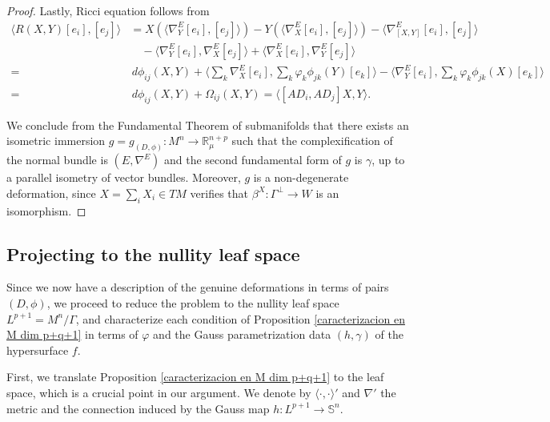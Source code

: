 \documentclass{article}
\theoremstyle{remark}
\begin{document}
\begin{proof}
    Lastly, Ricci equation follows from
    \begin{align*}
        \langle R(X,Y)[e_i],[e_j]\rangle&=X(\langle\nabla^E_Y[e_i],[e_j]\rangle)-Y(\langle\nabla^E_X[e_i],[e_j]\rangle)-\langle\nabla^E_{[X,Y]}[e_i],[e_j]\rangle\\
        &\quad-\langle\nabla^E_Y[e_i],\nabla^E_X[e_j]\rangle+\langle\nabla^E_X[e_i],\nabla^E_Y[e_j]\rangle\\
        =&\, d\phi_{ij}(X,Y)+\Big\langle\sum_k \nabla^E_X[e_i],\sum_k \varphi_k\phi_{jk}(Y)[e_k]\Big\rangle-\Big\langle\nabla^E_Y[e_i],\sum_k \varphi_k\phi_{jk}(X)[e_k]\Big\rangle\\
        =&\, d\phi_{ij}(X,Y)+\Omega_{ij}(X,Y)=\langle[AD_i,AD_j]X,Y\rangle.
    \end{align*}
    
    We conclude from the Fundamental Theorem of submanifolds that there exists an isometric immersion $g=g_{(D,\phi)}:M^n\rightarrow\mathbb{R}^{n+p}_{\mu}$ such that the complexification of the normal bundle is $(E,\nabla^E)$ and the second fundamental form of $g$ is $\gamma$, up to a parallel isometry of vector bundles. Moreover, $g$ is a non-degenerate deformation, since $X=\sum_i X_i\in TM$ verifies that $\beta^X:\Gamma^\perp\rightarrow W$ is an isomorphism.
\end{proof}
\subsection{Projecting to the nullity leaf space}
Since we now have a description of the genuine deformations in terms of pairs $(D,\phi)$, we proceed to reduce the problem to the nullity leaf space $L^{p+1}=M^n/\Gamma$, and characterize each condition of Proposition \ref{caracterizacion en M dim p+q+1} in terms of $\varphi$ and the Gauss parametrization data $(h,\gamma)$ of the hypersurface $f$.
\\\text{ }


First, we translate Proposition \ref{caracterizacion en M dim p+q+1} to the leaf space, which is a crucial point in our argument. We denote by $\langle\cdot,\cdot\rangle'$ and $\nabla'$ the metric and the connection induced by the Gauss map $h:L^{p+1}\rightarrow\mathbb{S}^n$. 
\end{document}
